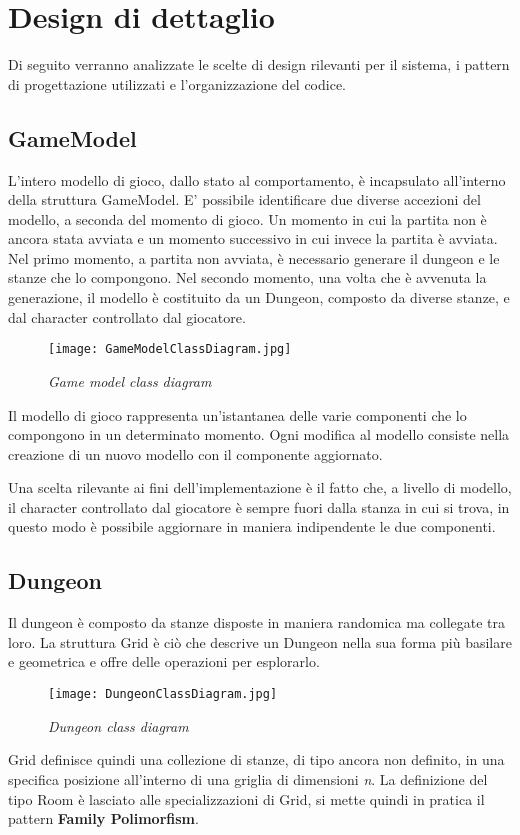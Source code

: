 \section{Design di dettaglio}
Di seguito verranno analizzate le scelte di design rilevanti per il sistema, i pattern di progettazione utilizzati e l'organizzazione del codice. 
\subsection{GameModel}
L'intero modello di gioco, dallo stato al comportamento, è incapsulato all'interno della struttura GameModel. E' possibile identificare due diverse accezioni del modello, a seconda del momento di gioco. 
Un momento in cui la partita non è ancora stata avviata e un momento successivo in cui invece la partita è avviata.
Nel primo momento, a partita non avviata, è necessario generare il dungeon e le stanze che lo compongono. Nel secondo momento, una volta che è avvenuta la generazione, il modello è costituito da un Dungeon, composto da diverse stanze, e dal character controllato dal giocatore. 

\begin{figure}[!hbt]
    \centering
    \texttt{[image: GameModelClassDiagram.jpg]}
    \caption{\textit{Game model class diagram}} 
\end{figure}
Il modello di gioco rappresenta un'istantanea delle varie componenti che lo compongono in un determinato momento. 
Ogni modifica al modello consiste nella creazione di un nuovo modello con il componente aggiornato. 

Una scelta rilevante ai fini dell'implementazione è il fatto che, a livello di modello, il character controllato dal giocatore è sempre fuori dalla stanza in cui si trova, in questo modo è possibile aggiornare in maniera indipendente le due componenti.
\subsection{Dungeon}
Il dungeon è composto da stanze disposte in maniera randomica ma collegate tra loro. 
La struttura Grid è ciò che descrive un Dungeon nella sua forma più basilare e geometrica e offre delle operazioni per esplorarlo. 
\begin{figure}[!hbt]
    \centering
    \texttt{[image: DungeonClassDiagram.jpg]}
    \caption{\textit{Dungeon class diagram}} 
\end{figure}

Grid definisce quindi una collezione di stanze, di tipo ancora non definito, in una specifica posizione all'interno di una griglia di dimensioni \textit{n}. La definizione del tipo Room è lasciato alle specializzazioni di Grid, si mette quindi in pratica il pattern \textbf{Family Polimorfism}.

